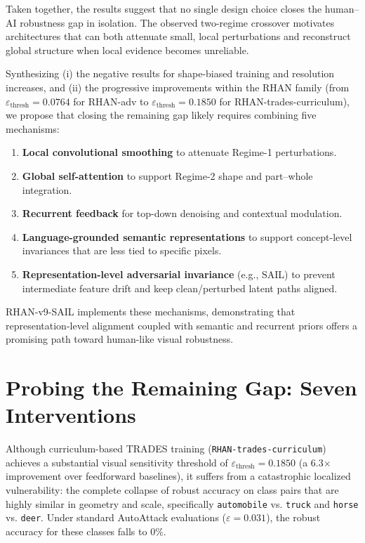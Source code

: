\documentclass[12pt,a4paper]{article}
\begin{document}
Taken together, the results suggest that no single design choice closes the
human--AI robustness gap in isolation. The observed two-regime crossover
motivates architectures that can both attenuate small, local perturbations and
reconstruct global structure when local evidence becomes unreliable.

Synthesizing (i) the negative results for shape-biased training and resolution
increases, and (ii) the progressive improvements within the RHAN family (from
$\varepsilon_{\text{thresh}}{=}0.0764$ for RHAN-adv to
$\varepsilon_{\text{thresh}}{=}0.1850$ for RHAN-trades-curriculum), we propose
that closing the remaining gap likely requires combining five mechanisms:

\begin{enumerate}[leftmargin=1.5em]
  \item \textbf{Local convolutional smoothing} to attenuate Regime-1
        perturbations.
  \item \textbf{Global self-attention} to support Regime-2 shape and
        part--whole integration.
  \item \textbf{Recurrent feedback} for top-down denoising and contextual
        modulation.
  \item \textbf{Language-grounded semantic representations} to support
        concept-level invariances that are less tied to specific pixels.
  \item \textbf{Representation-level adversarial invariance} (e.g., SAIL) to prevent intermediate feature drift and keep clean/perturbed latent paths aligned.
\end{enumerate}

RHAN-v9-SAIL implements these mechanisms, demonstrating that representation-level alignment coupled with semantic and recurrent priors offers a promising path toward human-like visual robustness.

\section{Probing the Remaining Gap: Seven Interventions}
\label{sec:seven_interventions}

Although curriculum-based TRADES training (\texttt{RHAN-trades-curriculum}) achieves a substantial visual sensitivity threshold of $\varepsilon_{\text{thresh}} = 0.1850$ (a 6.3$\times$ improvement over feedforward baselines), it suffers from a catastrophic localized vulnerability: the complete collapse of robust accuracy on class pairs that are highly similar in geometry and scale, specifically \texttt{automobile} vs. \texttt{truck} and \texttt{horse} vs. \texttt{deer}. Under standard AutoAttack evaluations ($\varepsilon = 0.031$), the robust accuracy for these classes falls to $0\%$.
\end{document}
